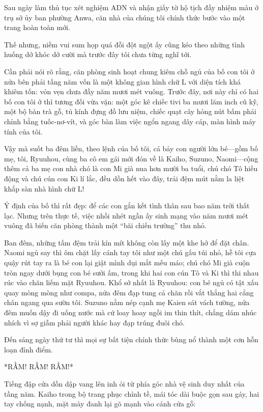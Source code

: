 ﻿\documentclass[../main.tex]{subfiles}
\begin{document}

Sau ngày làm thủ tục xét nghiệm ADN và nhận giấy tờ hộ tịch đầy nhiệm màu ở trụ sở ủy ban phường Anwa, căn nhà của chúng tôi chính thức bước vào một trang hoàn toàn mới. 

Thế nhưng, niềm vui sum họp quá đỗi đột ngột ấy cũng kéo theo những tình huống dở khóc dở cười mà trước đây tôi chưa từng nghĩ tới.

Cần phải nói rõ rằng, căn phòng sinh hoạt chung kiêm chỗ ngủ của bố con tôi ở nửa bên phải tầng năm vốn là một không gian hình chữ L với diện tích khá khiêm tốn: vỏn vẹn chưa đầy năm mươi mét vuông. Trước đây, nơi này chỉ có hai bố con tôi ở thì tương đối vừa vặn: một góc kê chiếc tivi ba mươi lăm inch cũ kỹ, một bộ bàn trà gỗ, tủ kính đựng đồ lưu niệm, chiếc quạt cây hỏng nút bấm phải chỉnh bằng tuốc-nơ-vít, và góc bàn làm việc ngổn ngang dây cáp, màn hình máy tính của tôi. 

Vậy mà suốt ba đêm liền, theo lệnh của bố tôi, cả bảy con người lớn bé—gồm bố mẹ, tôi, Ryuuhou, cùng ba cô em gái mới đón về là Kaiho, Suzuno, Naomi—cộng thêm cả ba mẹ con nhà chó là con Mi già nua hơn mười ba tuổi, chú chó Tô hiếu động và chú cún con Ki lí lắc, đều dồn hết vào đây, trải đệm mút nằm la liệt khắp sàn nhà hình chữ L!

Ý định của bố thì rất đẹp: để các con gắn kết tình thân sau bao năm trời thất lạc. Nhưng trên thực tế, việc nhồi nhét ngần ấy sinh mạng vào năm mươi mét vuông đã biến căn phòng thành một ``bãi chiến trường'' thu nhỏ.

Ban đêm, những tấm đệm trải kín mít không còn lấy một khe hở để đặt chân. Naomi ngủ say thì ôm chặt lấy cánh tay tôi như một chú gấu túi nhỏ, hễ tôi cựa quậy rút tay ra là bé con lại giật mình dụi mắt mếu máo; chú chó Mi già cuộn tròn ngay dưới bụng con bé sưởi ấm, trong khi hai con cún Tô và Ki thì thi nhau rúc vào chăn liếm mặt Ryuuhou. Khổ sở nhất là Ryuuhou: con bé ngủ có tật xấu quay mòng mòng như compa, nửa đêm đạp tung cả chăn rồi vắt thẳng hai cẳng chân ngang qua sườn tôi. Suzuno nằm nép cạnh mẹ Kaien sát vách tường, nửa đêm muốn dậy đi uống nước mà cứ loay hoay ngồi im thin thít, chẳng dám nhúc nhích vì sợ giẫm phải người khác hay đạp trúng đuôi chó.

Đến sáng ngày thứ tư thì mọi sự bất tiện chính thức bùng nổ thành một cơn hỗn loạn đỉnh điểm.

*RẦM! RẦM! RẦM!*

Tiếng đập cửa dồn dập vang lên inh ỏi từ phía góc nhà vệ sinh duy nhất của tầng năm. Kaiho trong bộ trang phục chỉnh tề, mái tóc dài buộc gọn sau gáy, hai tay chống nạnh, mặt mày đanh lại gõ mạnh vào cánh cửa gỗ:
\end{document}

